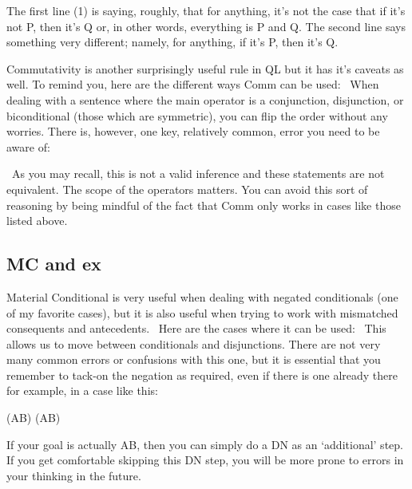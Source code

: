 The first line (1) is saying, roughly, that for anything, it's not the case that if it's not P, then it's Q or, in other words, everything is P and Q. The second line says something very different; namely, for anything, if it's P, then it's Q. 

Commutativity is another surprisingly useful rule in QL but it has it's caveats as well. To remind you, here are the different ways Comm can be used: 
When dealing with a sentence where the main operator is a conjunction, disjunction, or biconditional (those which are symmetric), you can flip the order without any worries. There is, however, one key, relatively common, error you need to be aware of:
\begin{fitchproof}
\end{fitchproof}
 As you may recall, this is not a valid inference and these statements are not equivalent. The scope of the operators matters. You can avoid this sort of reasoning by being mindful of the fact that Comm only works in cases like those listed above. 

\subsection{MC and \eiff ex}

Material Conditional is very useful when dealing with negated conditionals (one of my favorite cases), but it is also useful when trying to work with mismatched consequents and antecedents.  Here are the cases where it can be used: 
This allows us to move between conditionals and disjunctions. There are not very many common errors or confusions with this one, but it is essential that you remember to tack-on the negation as required, even if there is one already there for example, in a case like this:
\begin{center}
(\enot A\eif B) \therefore  (\enot \enot A\eor B)
\end{center}
If your goal is actually A\eor B, then you can simply do a DN as an `additional' step. If you get comfortable skipping this DN step, you will be more prone to errors in your thinking in the future. 


